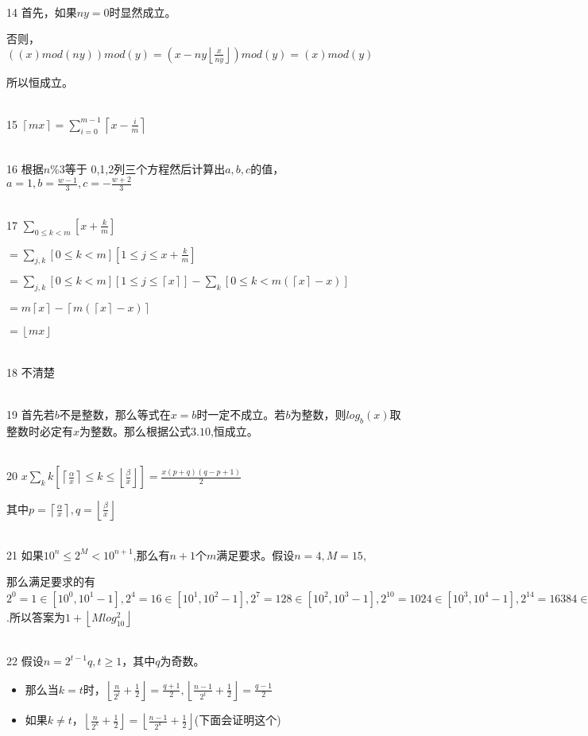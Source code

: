 \documentclass[onecolumn]{article}
\begin{document}
~\\
14 首先，如果$ny=0$时显然成立。\par
否则，$((x)mod(ny))mod(y)=(x-ny\left \lfloor \frac{x}{ny} \right \rfloor)mod(y)=(x)mod(y)$ \par
所以恒成立。\par
~\\
15 $\left \lceil mx \right \rceil=\sum_{i=0}^{m-1}\left \lceil x-\frac{i}{m} \right \rceil$ \par
~\\
16 根据$n$\%3等于 0,1,2列三个方程然后计算出$a,b,c$的值，$a=1,b=\frac{w-1}{3},c=-\frac{w+2}{3}$ \par
~\\
17 $\sum_{0\leq k<m}[x+\frac{k}{m}]$ \par
$=\sum_{j,k}[0\leq k<m][1\leq j \leq x+\frac{k}{m}]$ \par
$=\sum_{j,k}[0\leq k<m][1\leq j \leq \left \lceil x \right \rceil]-\sum_{k}[0\leq k <m(\left \lceil x \right \rceil-x)]$ \par
$=m\left \lceil x \right \rceil-\left \lceil m(\left \lceil x \right \rceil-x) \right \rceil$ \par
$=\left \lfloor mx \right \rfloor$ \par
~\\
18 不清楚 \par
~\\
19 首先若$b$不是整数，那么等式在$x=b$时一定不成立。若$b$为整数，则$log_{b}(x)$取整数时必定有$x$为整数。那么根据公式$3.10$,恒成立。  \par
~\\
20 $x\sum_{k}k[\left \lceil \frac{\alpha}{x} \right \rceil\leq k \leq \left \lfloor \frac{\beta}{x} \right \rfloor]=\frac{x(p+q)(q-p+1)}{2}$ \par
其中$p=\left \lceil \frac{\alpha}{x} \right \rceil,q=\left \lfloor \frac{\beta}{x} \right \rfloor$ \par
~\\
21 如果$10^{n}\leq 2^M <10^{n+1}$,那么有$n+1$个$m$满足要求。假设$n=4,M=15$,\par
那么满足要求的有$2^{0}=1 \in[10^{0},10^{1}-1],2^{4}=16\in[10^{1},10^{2}-1],2^{7}=128\in[10^{2},10^{3}-1],2^{10}=1024\in[10^{3},10^{4}-1],2^{14}=16384\in[10^{4},10^{5}-1]$.所以答案为$1+\left \lfloor Mlog_{10}^{2} \right \rfloor$ \par
~\\
22  假设$n=2^{t-1}q,t \ge 1$，其中$q$为奇数。
\begin{itemize}
	\item 那么当$k=t$时，$\left \lfloor \frac{n}{2^{t}}+\frac{1}{2} \right \rfloor=\frac{q+1}{2},\left \lfloor \frac{n-1}{2^{t}}+\frac{1}{2} \right \rfloor=\frac{q-1}{2}$
	\item 如果$k\neq t$，$\left \lfloor \frac{n}{2^{k}}+\frac{1}{2} \right \rfloor=\left \lfloor \frac{n-1}{2^{k}}+\frac{1}{2} \right \rfloor$(下面会证明这个)
\end{itemize}
\end{document}
